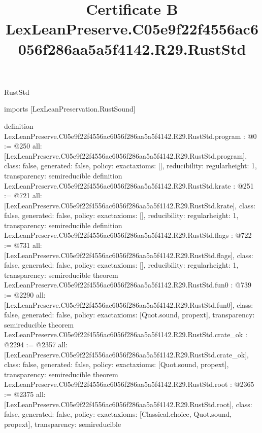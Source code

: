 \begin{lexlean}{RustStd}
\title{Certificate B LexLeanPreserve.C05e9f22f4556ac6056f286aa5a5f4142.R29.RustStd}
\begin{coremodule}
imports [LexLeanPreservation.RustSound]

definition LexLeanPreserve.C05e9f22f4556ac6056f286aa5a5f4142.R29.RustStd.program : @0 := @250 {
  all: [LexLeanPreserve.C05e9f22f4556ac6056f286aa5a5f4142.R29.RustStd.program],
  class: false,
  generated: false,
  policy: exact{axioms: []},
  reducibility: regular{height: 1},
  transparency: semireducible
}
definition LexLeanPreserve.C05e9f22f4556ac6056f286aa5a5f4142.R29.RustStd.krate : @251 := @721 {
  all: [LexLeanPreserve.C05e9f22f4556ac6056f286aa5a5f4142.R29.RustStd.krate],
  class: false,
  generated: false,
  policy: exact{axioms: []},
  reducibility: regular{height: 1},
  transparency: semireducible
}
definition LexLeanPreserve.C05e9f22f4556ac6056f286aa5a5f4142.R29.RustStd.flags : @722 := @731 {
  all: [LexLeanPreserve.C05e9f22f4556ac6056f286aa5a5f4142.R29.RustStd.flags],
  class: false,
  generated: false,
  policy: exact{axioms: []},
  reducibility: regular{height: 1},
  transparency: semireducible
}
theorem LexLeanPreserve.C05e9f22f4556ac6056f286aa5a5f4142.R29.RustStd.fun0 : @739 := @2290 {
  all: [LexLeanPreserve.C05e9f22f4556ac6056f286aa5a5f4142.R29.RustStd.fun0],
  class: false,
  generated: false,
  policy: exact{axioms: [Quot.sound, propext]},
  transparency: semireducible
}
theorem LexLeanPreserve.C05e9f22f4556ac6056f286aa5a5f4142.R29.RustStd.crate_ok : @2294 := @2357 {
  all: [LexLeanPreserve.C05e9f22f4556ac6056f286aa5a5f4142.R29.RustStd.crate_ok],
  class: false,
  generated: false,
  policy: exact{axioms: [Quot.sound, propext]},
  transparency: semireducible
}
theorem LexLeanPreserve.C05e9f22f4556ac6056f286aa5a5f4142.R29.RustStd.root : @2365 := @2375 {
  all: [LexLeanPreserve.C05e9f22f4556ac6056f286aa5a5f4142.R29.RustStd.root],
  class: false,
  generated: false,
  policy: exact{axioms: [Classical.choice, Quot.sound, propext]},
  transparency: semireducible
}


\end{coremodule}
\end{lexlean}
